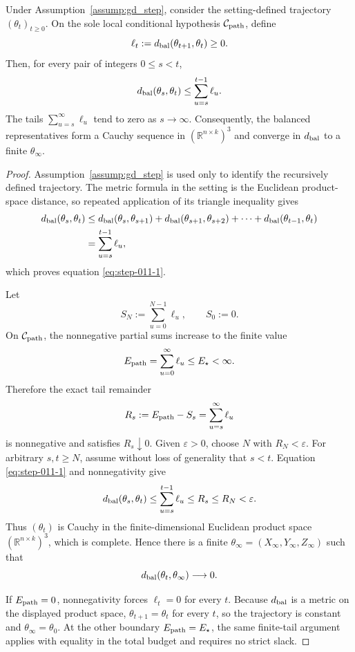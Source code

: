 \begin{lemma}
\label{lem:step-011-finite-path-limit}
Under Assumption~\ref{assump:gd_step}, consider the setting-defined trajectory
\((\theta_t)_{t\ge0}\). On the sole local conditional hypothesis
\(\mathcal C_{\rm path}\), define
\[
  \ell_t:=d_{\rm bal}(\theta_{t+1},\theta_t)\ge0.
\]
Then, for every pair of integers \(0\le s<t\),
\begin{equation}
  d_{\rm bal}(\theta_s,\theta_t)
  \le \sum_{u=s}^{t-1}\ell_u.                         \label{eq:step-011-1}
\end{equation}
The tails \(\sum_{u=s}^{\infty}\ell_u\) tend to zero as
\(s\to\infty\). Consequently, the balanced representatives form a Cauchy
sequence in \((\mathbb R^{n\times k})^3\) and converge in
\(d_{\rm bal}\) to a finite \(\theta_\infty\).

\end{lemma}

\begin{proof}
Assumption~\ref{assump:gd_step} is used only to
identify the recursively defined trajectory. The metric formula in the
setting is the Euclidean product-space distance, so repeated application of
its triangle inequality gives
\[
\begin{aligned}
  d_{\rm bal}(\theta_s,\theta_t)
  &\le d_{\rm bal}(\theta_s,\theta_{s+1})
      +d_{\rm bal}(\theta_{s+1},\theta_{s+2})
      +\cdots+d_{\rm bal}(\theta_{t-1},\theta_t)\\
  &=\sum_{u=s}^{t-1}\ell_u,
\end{aligned}
\]
which proves equation \eqref{eq:step-011-1}.

Let
\[
  S_N:=\sum_{u=0}^{N-1}\ell_u,
  \qquad S_0:=0.
\]
On \(\mathcal C_{\rm path}\), the nonnegative partial sums increase to the
finite value
\[
  E_{\rm path}=\sum_{u=0}^{\infty}\ell_u\le E_\star<\infty.
\]
Therefore the exact tail remainder
\[
  R_s:=E_{\rm path}-S_s=\sum_{u=s}^{\infty}\ell_u
\]
is nonnegative and satisfies \(R_s\downarrow0\). Given
\(\varepsilon>0\), choose \(N\) with \(R_N<\varepsilon\). For arbitrary
\(s,t\ge N\), assume without loss of generality that \(s<t\). Equation \eqref{eq:step-011-1}
and nonnegativity give
\[
  d_{\rm bal}(\theta_s,\theta_t)
  \le\sum_{u=s}^{t-1}\ell_u
  \le R_s\le R_N<\varepsilon.
\]
Thus \((\theta_t)\) is Cauchy in the finite-dimensional Euclidean product
space
\(
  (\mathbb R^{n\times k})^3
\),
which is complete. Hence there is a finite
\(
  \theta_\infty=(X_\infty,Y_\infty,Z_\infty)
\)
such that
\[
  d_{\rm bal}(\theta_t,\theta_\infty)\longrightarrow0.
\]

If \(E_{\rm path}=0\), nonnegativity forces \(\ell_t=0\) for every \(t\).
Because \(d_{\rm bal}\) is a metric on the displayed product space,
\(\theta_{t+1}=\theta_t\) for every \(t\), so the trajectory is constant and
\(\theta_\infty=\theta_0\). At the other boundary
\(E_{\rm path}=E_\star\), the same finite-tail argument applies with equality
in the total budget and requires no strict slack. 

\end{proof}


